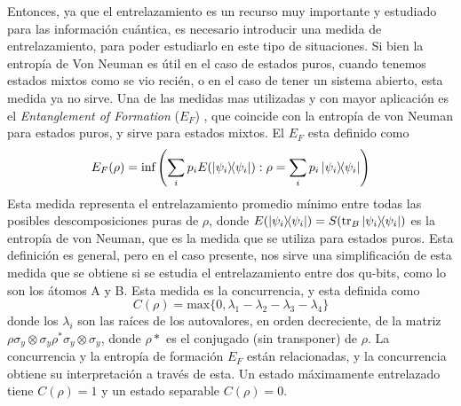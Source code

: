 Entonces, ya que el entrelazamiento es un recurso muy importante y estudiado para las información cuántica, es necesario introducir una medida de entrelazamiento, para poder estudiarlo en este tipo de situaciones. Si bien la entropía de Von Neuman es útil en el caso de estados puros, cuando tenemos estados mixtos como se vio recién, o en el caso de tener un sistema abierto, esta medida ya no sirve. Una de las medidas mas utilizadas y con mayor aplicación es el \textit{Entanglement of Formation} ($E_F$) \cite{an intro to entanglement measures}, que coincide con la entropía de von Neuman para estados puros, y sirve para estados mixtos. El $E_F$ esta definido como
\begin{equation}
    E_F(\rho)=\text{inf}\left( \sum_i p_i E(\ketbra{\psi_i}{\psi_i}) : \rho = \sum_i p_i\ketbra{\psi_i}{\psi_i}\right)
\end{equation}
Esta medida representa el entrelazamiento promedio mínimo entre todas las posibles descomposiciones puras de $\rho$, donde $E(\ketbra{\psi_i}{\psi_i})=S(\tr_B{\ketbra{\psi_i}{\psi_i}})$ es la entropía de von Neuman, que es la medida que se utiliza para estados puros. Esta definición es general, pero en el caso presente, nos sirve una simplificación de esta medida que se obtiene si se estudia el entrelazamiento entre dos qu-bits, como lo son los átomos A y B. Esta medida es la concurrencia, y esta definida como
\begin{equation}
    C(\rho)=\text{max}\{0,\lambda_1-\lambda_2-\lambda_3-\lambda_4\}
\end{equation}
donde los $\lambda_i$ son las raíces de los autovalores, en orden decreciente, de la matriz $\rho\sigma_y\otimes\sigma_y\rho^*\sigma_y\otimes\sigma_y$, donde $\rho*$ es el conjugado (sin transponer) de $\rho$. La concurrencia y la entropía de formación $E_F$ están relacionadas, y la concurrencia obtiene su interpretación a través de esta. Un estado máximamente entrelazado tiene $C(\rho)=1$ y un estado separable $C(\rho)=0$. 



